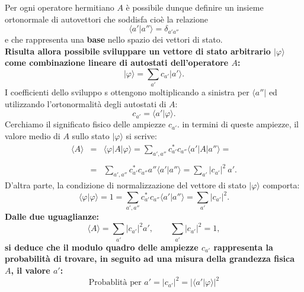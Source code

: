 Per ogni operatore hermitiano $A$ è possibile dunque definire un insieme ortonormale di autovettori che soddisfa cioè la relazione 
\begin{equation}
\langle a' \vert a'' \rangle = \delta _{a' a''} 
\end{equation}
e che rappresenta una \textbf{base} nello spazio dei vettori di stato.\\
\textbf{Risulta allora possibile sviluppare un vettore di stato arbitrario $\vert \varphi \rangle $ come combinazione lineare di autostati dell'operatore $A$:}
\begin{equation}
\vert \varphi \rangle = \sum _{a'} c_{a'} \vert a' \rangle .
\end{equation}
I coefficienti dello sviluppo s ottengono moltiplicando  a sinistra per $\langle a'' \vert $ ed utilizzando l'ortonormalità degli autostati di $A$:
\begin{equation}
c_{a'} = \langle a' \vert \varphi \rangle .
\end{equation}
Cerchiamo il significato fisico delle ampiezze $c_{a'}$. in termini di queste ampiezze, il valore medio di $A$ sullo stato $\vert \varphi \rangle$ si scrive:
\begin{eqnarray}
\langle A \rangle & = &  \langle \varphi \vert A \vert \varphi \rangle= \sum _{a',a''} c_{a'}^* c_{a''} \langle a' \vert A \vert a'' \rangle = \nonumber \\
\\
& = & \sum _{a',a''} c_{a'}^* c_{a''} a'' \langle a' \vert a'' \rangle = \sum _{a'} \vert c_{a'} \vert ^2\ a'. \nonumber
\end{eqnarray}
D'altra parte, la condizione di normalizzazione del vettore di stato $\vert \varphi \rangle$ comporta:
\begin{equation}
\langle \varphi \vert \varphi \rangle = 1 = \sum _{a',a''} c_{a'} ^* c_{a''}  \langle a' \vert a'' \rangle = \sum _{a'} \vert c_{a'} \vert ^2 .
\end{equation}
\textbf{Dalle due uguaglianze:}
\begin{equation}
\langle A \rangle = \sum _{a'} \vert c_{a'} \vert ^2 a', \qquad \sum _{a'} \vert c_{a'} \vert ^2 =1 , 
\end{equation}
\textbf{si deduce che il modulo quadro delle ampiezze $c_{a'}$ rappresenta la probabilità di trovare, in seguito ad una misura della grandezza fisica $A$, il valore $a'$:}
\begin{equation}
\textrm{Probablità per }a'= \vert c_{a'} \vert ^2 = \vert \langle a' \vert \varphi \rangle \vert ^2
\end{equation}
